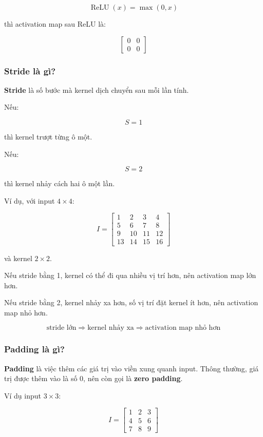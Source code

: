 \[
    \operatorname{ReLU}(x)=\max(0,x)
\]

thì activation map sau ReLU là:

\[
\begin{bmatrix}
0 & 0\\
0 & 0
\end{bmatrix}
\]

\subsubsection{Stride là gì?}

\textbf{Stride} là số bước mà kernel dịch chuyển sau mỗi lần tính.

Nếu:

\[
    S=1
\]

thì kernel trượt từng ô một.

Nếu:

\[
    S=2
\]

thì kernel nhảy cách hai ô một lần.

Ví dụ, với input $4 \times 4$:

\[
I=
\begin{bmatrix}
1 & 2 & 3 & 4\\
5 & 6 & 7 & 8\\
9 & 10 & 11 & 12\\
13 & 14 & 15 & 16
\end{bmatrix}
\]

và kernel $2 \times 2$.

Nếu stride bằng 1, kernel có thể đi qua nhiều vị trí hơn, nên activation map lớn hơn.

Nếu stride bằng 2, kernel nhảy xa hơn, số vị trí đặt kernel ít hơn, nên activation map nhỏ hơn.

\[
    \text{stride lớn}
    \Rightarrow
    \text{kernel nhảy xa}
    \Rightarrow
    \text{activation map nhỏ hơn}
\]

\subsubsection{Padding là gì?}

\textbf{Padding} là việc thêm các giá trị vào viền xung quanh input. Thông thường, giá trị được thêm vào là số 0, nên còn gọi là \textbf{zero padding}.

Ví dụ input $3 \times 3$:

\[
I=
\begin{bmatrix}
1 & 2 & 3\\
4 & 5 & 6\\
7 & 8 & 9
\end{bmatrix}
\]

